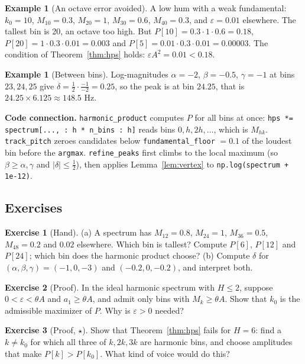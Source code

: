 \documentclass[11pt]{article}
\theoremstyle{definition}
\newtheorem{example}[theorem]{Example}
\newtheorem{innerexercise}{Exercise}[section]
\newenvironment{exercise}[1][]{\begin{innerexercise}[#1]}{\end{innerexercise}}
\newcommand{\abs}[1]{\lvert #1\rvert}
\newcommand{\code}[1]{\texttt{#1}}
\begin{document}
\begin{example}[An octave error avoided]
A low hum with a weak fundamental: $k_0=10$, $M_{10}=0.3$, $M_{20}=1$, $M_{30}=0.6$,
$M_{40}=0.3$, and $\varepsilon=0.01$ elsewhere. The tallest bin is 20, an octave too
high. But $P[10]=0.3\cdot1\cdot0.6=0.18$, $P[20]=1\cdot0.3\cdot0.01=0.003$ and
$P[5]=0.01\cdot0.3\cdot0.01=0.00003$. The condition of Theorem~\ref{thm:hps} holds:
$\varepsilon A^2=0.01<0.18$.
\end{example}

\begin{example}[Between bins]
Log-magnitudes $\alpha=-2$, $\beta=-0.5$, $\gamma=-1$ at bins $23,24,25$ give
$\delta=\frac12\cdot\frac{-1}{-2}=0.25$, so the peak is at bin $24.25$, that is
$24.25\times6.125\approx148.5$ Hz.
\end{example}

\begin{connection}
\textbf{Code connection.} \code{harmonic\_product} computes $P$ for all bins at once:
\code{hps *= spectrum[..., : h * n\_bins : h]} reads bins $0,h,2h,\dots$, which is
$M_{hk}$. \code{track\_pitch} zeroes candidates below
\code{fundamental\_floor} $=0.1$ of the loudest bin before the \code{argmax}.
\code{refine\_peaks} first climbs to the local maximum (so $\beta\ge\alpha,\gamma$ and
$\abs\delta\le\frac12$), then applies Lemma~\ref{lem:vertex} to
\code{np.log(spectrum + 1e-12)}.
\end{connection}

\subsection{Exercises}
\begin{exercise}[Hand]\label{ex:hpshand}
(a) A spectrum has $M_{12}=0.8$, $M_{24}=1$, $M_{36}=0.5$, $M_{48}=0.2$ and $0.02$
elsewhere. Which bin is tallest? Compute $P[6]$, $P[12]$ and $P[24]$; which bin does
the harmonic product choose? (b) Compute $\delta$ for
$(\alpha,\beta,\gamma)=(-1,0,-3)$ and $(-0.2,0,-0.2)$, and interpret both.
\end{exercise}

\begin{exercise}[Proof]\label{ex:floor}
In the ideal harmonic spectrum with $H\le2$, suppose $0<\varepsilon<\theta A$ and
$a_1\ge\theta A$, and admit only bins with $M_k\ge\theta A$. Show that $k_0$ is the
admissible maximizer of $P$. Why is $\varepsilon>0$ needed?
\end{exercise}

\begin{exercise}[Proof, $\star$]\label{ex:h6}
Show that Theorem~\ref{thm:hps} fails for $H=6$: find a $k\ne k_0$ for which all three
of $k,2k,3k$ are harmonic bins, and choose amplitudes that make $P[k]>P[k_0]$. What
kind of voice would do this?
\end{exercise}
\end{document}
